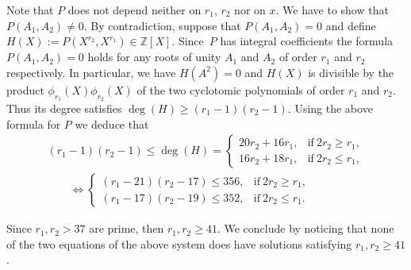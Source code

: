 \documentclass[11pt]{article}
\numberwithin{equation}{section}
\begin{document}
Note that $P$ does not depend neither on $r_1$, $r_2$ nor on $x$. We have to show that $P(A_1,A_2)\neq 0$. By contradiction, suppose that $P(A_1, A_2)=0$ and define $H(X):=P(X^{r_2}, X^{r_1})\in \mathbb{Z}[X]$. Since~$P$ has integral coefficients the formula $P(A_1,A_2)=0$ holds for any roots of unity $A_1$ and $A_2$ of order $r_1$ and $r_2$ respectively. In particular, we have $H(A^2)=0$ and $H(X)$ is divisible by the product $\phi_{r_1}(X)\phi_{r_2}(X)$ of the two cyclotomic polynomials of order $r_1$ and $r_2$. Thus its degree satisfies $\deg (H) \geq (r_1-1)(r_2-1)$. Using the above formula for $P$ we deduce that
\begin{gather*}
 (r_1-1)(r_2-1) \leq \deg (H) = \begin{cases}
20r_2+16r_1, & \text{if} \ 2r_2\geq r_1, \\
16r_2 +18r_1, &\text{if} \ 2r_2\leq r_1,
\end{cases}\\
\qquad {} \Leftrightarrow
 \begin{cases}
(r_1-21)(r_2-17)\leq 356, & \text{if} \ 2r_2\geq r_1, \\
(r_1-17)(r_2-19)\leq 352, &\text{if} \ 2r_2\leq r_1.
\end{cases}
\end{gather*}

Since $r_1, r_2> 37$ are prime, then $r_1, r_2\geq 41$. We conclude by noticing that none of the two equations of the above system does have solutions satisfying $r_1, r_2\geq 41$.
\end{document}
